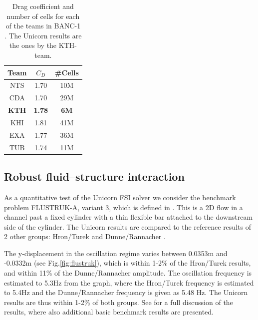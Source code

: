 \begin{table}[hbt]
\begin{center}
\begin{tabular}{|c|cc|}
\hline
Team & $C_D$ & \#Cells \\
\hline
NTS &    1.70 &    10M \\
CDA  &   1.70  &   29M \\
\textbf{KTH}  &   \textbf{1.78}  &   \textbf{6M}\\
KHI  &   1.81  &   41M \\
EXA  &   1.77  &   36M \\
TUB  &   1.74  &   11M \\
\hline
\end{tabular}
\caption{\label{tab:hoffman-1-rlg} Drag coefficient and number of cells for each of the teams in BANC-1 \cite{SpalartMejia2011}. The Unicorn results are the ones by the KTH-team.}
\end{center}
\end{table}

\subsection{Robust fluid--structure interaction}

As a quantitative test of the Unicorn FSI solver we consider the benchmark problem FLUSTRUK-A, variant 3, which is defined in \cite{HronTurek2005}. This is a 2D flow in a channel past a fixed cylinder with a thin flexible bar attached to the downstream side of the cylinder. The Unicorn results are compared to the reference results of 2 other groups: Hron/Turek \cite{HronTurek2005} and Dunne/Rannacher \cite{DunneRannacher2006}.

The y-displacement in the oscillation regime varies between 0.0353m and -0.0332m (see Fig.\ref{fig:flustruk}), which is within 1-2\% of the Hron/Turek results, and within 11\% of the Dunne/Rannacher amplitude. The oscillation frequency is estimated to 5.3Hz from the graph, where the Hron/Turek frequency is estimated to 5.4Hz and the Dunne/Rannacher frequency is given as 5.48 Hz. The Unicorn results are thus within 1-2\% of both groups. See \cite{HoffmanJanssonStockli2011} for a full discussion of the results, where also additional basic benchmark results are presented.

